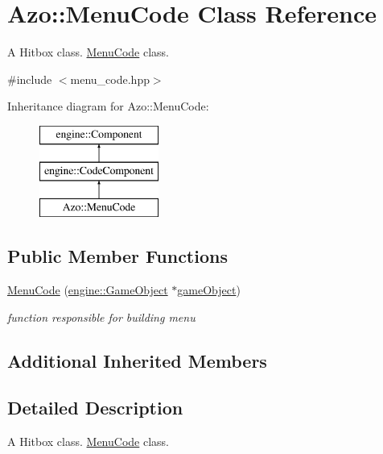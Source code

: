 \hypertarget{class_azo_1_1_menu_code}{}\section{Azo\+:\+:Menu\+Code Class Reference}
\label{class_azo_1_1_menu_code}


A Hitbox class. \hyperlink{class_azo_1_1_menu_code}{Menu\+Code} class.  




{\ttfamily \#include $<$menu\+\_\+code.\+hpp$>$}

Inheritance diagram for Azo\+:\+:Menu\+Code\+:\begin{figure}[H]
\begin{center}
\leavevmode
\includegraphics[height=3.000000cm]{class_azo_1_1_menu_code}
\end{center}
\end{figure}
\subsection*{Public Member Functions}
\begin{DoxyCompactItemize}
\item 
\hyperlink{class_azo_1_1_menu_code_a97efbd5b0b0e65a1c5adb823aa978e08}{Menu\+Code} (\hyperlink{classengine_1_1_game_object}{engine\+::\+Game\+Object} $\ast$\hyperlink{classengine_1_1_component_ad4a4865ca4df98ebea34d04a4ec5ad07}{game\+Object})
\begin{DoxyCompactList}\small\item\em function responsible for building menu \end{DoxyCompactList}\end{DoxyCompactItemize}
\subsection*{Additional Inherited Members}


\subsection{Detailed Description}
A Hitbox class. \hyperlink{class_azo_1_1_menu_code}{Menu\+Code} class. 

